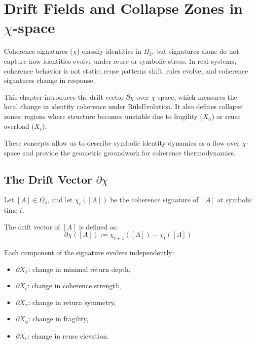 \chapter{Drift Fields and Collapse Zones in $\chi$-space} \label{chapter-4-drift-fields-and-collapse-zones-in-chi-space}

Coherence signatures ($\chi$) classify identities in $\Omega_3$, but signatures alone do not capture how identities evolve under reuse or symbolic stress. In real systems, coherence behavior is not static: reuse patterns shift, rules evolve, and coherence signatures change in response.

\medskip

This chapter introduces the drift vector $\partial\chi$ over $\chi$-space, which measures the local change in identity coherence under RuleEvolution. It also defines collapse zones: regions where structure becomes unstable due to fragility ($X_\phi$) or reuse overload ($X_\epsilon$).

\medskip

These concepts allow us to describe symbolic identity dynamics as a flow over $\chi$-space and provide the geometric groundwork for coherence thermodynamics.

\section{The Drift Vector $\partial\chi$} \label{the-drift-vector-chi}

Let $[A] \in \Omega_3$, and let $\chi_t([A])$ be the coherence signature of $[A]$ at symbolic time $t$.

\begin{definition} \label{def:drift-vector}
The drift vector of $[A]$ is defined as:
\begin{equation} \label{eq:drift-vector}
\partial\chi([A]) := \chi_{t+1}([A]) - \chi_t([A])
\end{equation}
\end{definition}

Each component of the signature evolves independently:
\begin{itemize}
    \item $\partial X_h$: change in minimal return depth,
    \item $\partial X_c$: change in coherence strength,
    \item $\partial X_\pi$: change in return symmetry,
    \item $\partial X_\phi$: change in fragility,
    \item $\partial X_\epsilon$: change in reuse elevation.
\end{itemize}

